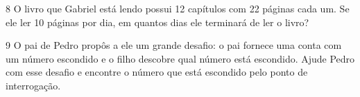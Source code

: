 \num{8} O livro que Gabriel está lendo possui 12 capítulos com 22 páginas cada
um. Se ele ler 10 páginas por dia, em quantos dias ele terminará de ler
o livro?


\num{9} O pai de Pedro propôs a ele um grande desafio:
o pai fornece uma conta com um número escondido e o filho 
descobre qual número está escondido. Ajude Pedro com esse desafio e
encontre o número que está escondido pelo ponto de interrogação.

